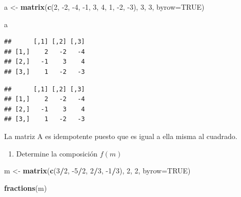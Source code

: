 \documentclass[]{article}
\newenvironment{Shaded}{\begin{snugshade}}{\end{snugshade}}
\newcommand{\DataTypeTok}[1]{\textcolor[rgb]{0.13,0.29,0.53}{#1}}
\newcommand{\DecValTok}[1]{\textcolor[rgb]{0.00,0.00,0.81}{#1}}
\newcommand{\KeywordTok}[1]{\textcolor[rgb]{0.13,0.29,0.53}{\textbf{#1}}}
\newcommand{\NormalTok}[1]{#1}
\newcommand{\OperatorTok}[1]{\textcolor[rgb]{0.81,0.36,0.00}{\textbf{#1}}}
\newcommand{\OtherTok}[1]{\textcolor[rgb]{0.56,0.35,0.01}{#1}}
\newcommand{\StringTok}[1]{\textcolor[rgb]{0.31,0.60,0.02}{#1}}
\providecommand{\tightlist}{%
  \setlength{\itemsep}{0pt}\setlength{\parskip}{0pt}}
\begin{document}
\begin{Shaded}
\begin{Highlighting}[]
\NormalTok{a <-}\StringTok{ }\KeywordTok{matrix}\NormalTok{(}\KeywordTok{c}\NormalTok{(}\DecValTok{2}\NormalTok{, }\DecValTok{-2}\NormalTok{, }\DecValTok{-4}\NormalTok{, }
              \DecValTok{-1}\NormalTok{, }\DecValTok{3}\NormalTok{, }\DecValTok{4}\NormalTok{,}
              \DecValTok{1}\NormalTok{, }\DecValTok{-2}\NormalTok{, }\DecValTok{-3}\NormalTok{), }
              \DecValTok{3}\NormalTok{, }\DecValTok{3}\NormalTok{, }\DataTypeTok{byrow=}\OtherTok{TRUE}\NormalTok{)}


\NormalTok{a}
\end{Highlighting}
\end{Shaded}

\begin{verbatim}
##      [,1] [,2] [,3]
## [1,]    2   -2   -4
## [2,]   -1    3    4
## [3,]    1   -2   -3
\end{verbatim}

\begin{Shaded}
\end{Shaded}

\begin{verbatim}
##      [,1] [,2] [,3]
## [1,]    2   -2   -4
## [2,]   -1    3    4
## [3,]    1   -2   -3
\end{verbatim}

La matriz A es idempotente puesto que es igual a ella misma al cuadrado.

\begin{enumerate}
\def\labelenumi{\arabic{enumi}.}
\setcounter{enumi}{2}
\tightlist
\item
  Determine la composición \(f(m)\)
\end{enumerate}

\begin{Shaded}
\begin{Highlighting}[]
\NormalTok{m <-}\StringTok{ }\KeywordTok{matrix}\NormalTok{(}\KeywordTok{c}\NormalTok{(}\DecValTok{3}\OperatorTok{/}\DecValTok{2}\NormalTok{, }\DecValTok{-5}\OperatorTok{/}\DecValTok{2}\NormalTok{, }
              \DecValTok{2}\OperatorTok{/}\DecValTok{3}\NormalTok{, }\DecValTok{-1}\OperatorTok{/}\DecValTok{3}\NormalTok{), }
              \DecValTok{2}\NormalTok{, }\DecValTok{2}\NormalTok{, }\DataTypeTok{byrow=}\OtherTok{TRUE}\NormalTok{)}

\KeywordTok{fractions}\NormalTok{(m)}
\end{Highlighting}
\end{Shaded}
\end{document}
